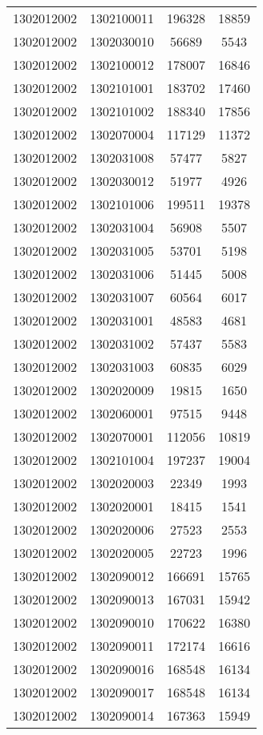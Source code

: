 \begin{longtable}[h]{llcc}
		1302012002 & 1302100011 & 196328 & 18859\\
		1302012002 & 1302030010 & 56689 & 5543\\
		1302012002 & 1302100012 & 178007 & 16846\\
		1302012002 & 1302101001 & 183702 & 17460\\
		1302012002 & 1302101002 & 188340 & 17856\\
		1302012002 & 1302070004 & 117129 & 11372\\
		1302012002 & 1302031008 & 57477 & 5827\\
		1302012002 & 1302030012 & 51977 & 4926\\
		1302012002 & 1302101006 & 199511 & 19378\\
		1302012002 & 1302031004 & 56908 & 5507\\
		1302012002 & 1302031005 & 53701 & 5198\\
		1302012002 & 1302031006 & 51445 & 5008\\
		1302012002 & 1302031007 & 60564 & 6017\\
		1302012002 & 1302031001 & 48583 & 4681\\
		1302012002 & 1302031002 & 57437 & 5583\\
		1302012002 & 1302031003 & 60835 & 6029\\
		1302012002 & 1302020009 & 19815 & 1650\\
		1302012002 & 1302060001 & 97515 & 9448\\
		1302012002 & 1302070001 & 112056 & 10819\\
		1302012002 & 1302101004 & 197237 & 19004\\
		1302012002 & 1302020003 & 22349 & 1993\\
		1302012002 & 1302020001 & 18415 & 1541\\
		1302012002 & 1302020006 & 27523 & 2553\\
		1302012002 & 1302020005 & 22723 & 1996\\
		1302012002 & 1302090012 & 166691 & 15765\\
		1302012002 & 1302090013 & 167031 & 15942\\
		1302012002 & 1302090010 & 170622 & 16380\\
		1302012002 & 1302090011 & 172174 & 16616\\
		1302012002 & 1302090016 & 168548 & 16134\\
		1302012002 & 1302090017 & 168548 & 16134\\
		1302012002 & 1302090014 & 167363 & 15949\\

\end{longtable}
